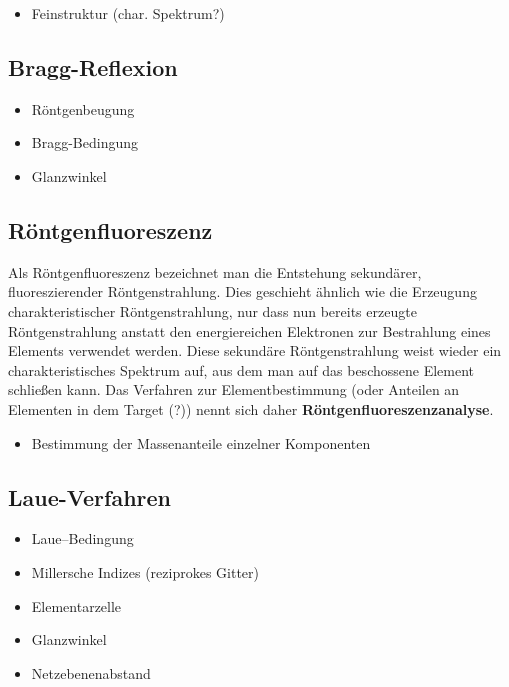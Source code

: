 \documentclass[10pt, a4paper]{article}
\begin{document}
\begin{itemize}
  \item Feinstruktur (char. Spektrum?)
\end{itemize}

\subsection{Bragg-Reflexion}

\begin{itemize}
  \item Röntgenbeugung
  \item Bragg-Bedingung
  \item Glanzwinkel
\end{itemize}
 
\subsection{Röntgenfluoreszenz}
  Als Röntgenfluoreszenz bezeichnet man die Entstehung sekundärer, fluoreszierender Röntgenstrahlung.
  Dies geschieht ähnlich wie die Erzeugung charakteristischer Röntgenstrahlung, nur dass nun bereits erzeugte Röntgenstrahlung anstatt den energiereichen Elektronen zur Bestrahlung eines Elements verwendet werden.
  Diese sekundäre Röntgenstrahlung weist wieder ein charakteristisches Spektrum auf, aus dem man auf das beschossene Element schließen kann.
  Das Verfahren zur Elementbestimmung (oder Anteilen an Elementen in dem Target (?)) nennt sich daher \textbf{Röntgenfluoreszenzanalyse}.
  
\begin{itemize}
  \item Bestimmung der Massenanteile einzelner Komponenten
\end{itemize}
  
\subsection{Laue-Verfahren}

\begin{itemize}
  \item Laue--Bedingung
  \item Millersche Indizes (reziprokes Gitter)
  \item Elementarzelle
  \item Glanzwinkel
  \item Netzebenenabstand
\end{itemize}  
\end{document}
